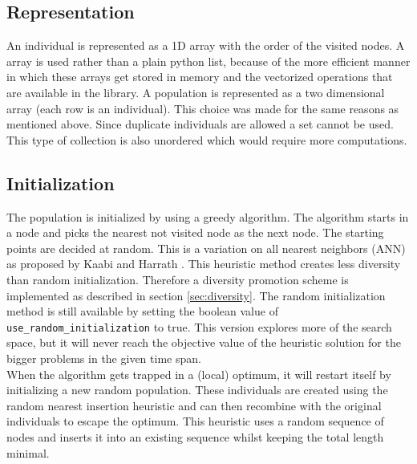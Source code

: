 \documentclass[a4paper,10pt]{article}
\newcommand{\ReplaceMe}[1]{{\color{blue}#1}}
\begin{document}

\subsection{Representation}


An individual is represented as a 1D  array with the order of the visited nodes. A  array is used rather than a plain python list, because of the more efficient manner in which these arrays get stored in memory and the vectorized operations that are available in the  library. A population is represented as a two dimensional array (each row is an individual). This choice was made for the same reasons as mentioned above. Since duplicate individuals are allowed a set cannot be used. This type of collection is also unordered which would require more computations.

\subsection{Initialization} \label{sec:init}


The population is initialized by using a greedy algorithm. The algorithm starts in a node and picks the nearest not visited node as the next node. The starting points are decided at random. This is a variation on all nearest neighbors (ANN) as proposed by Kaabi and Harrath \cite{ann}. This heuristic method creates less diversity than random initialization. Therefore a diversity promotion scheme is implemented as described in section \ref{sec:diversity}. The random initialization method is still available by setting the boolean value of \texttt{use\_random\_initialization} to true. This version explores more of the search space, but it will never reach the objective value of the heuristic solution for the bigger problems in the given time span.\\
When the algorithm gets trapped in a (local) optimum, it will restart itself by initializing a new random population. These individuals are created using the random nearest insertion heuristic \cite{rni} and can then recombine with the original individuals to escape the optimum. This heuristic uses a random sequence of nodes and inserts it into an existing sequence whilst keeping the total length minimal.
\end{document}
